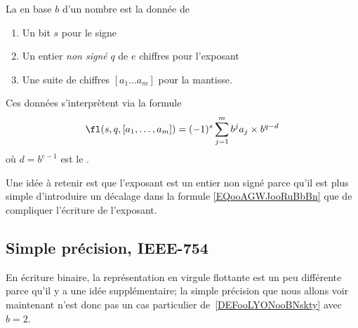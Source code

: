 \begin{definition}     \label{DEFooLYONooBNskty}
    La  en base \( b\) d'un nombre est la donnée de
    \begin{enumerate}
        \item
            Un bit \( s\) pour le signe
        \item
            Un entier \emph{non signé} \( q\) de \( e\) chiffres pour l'exposant
        \item
            Une suite de chiffres \( [a_1\ldots a_m]\) pour la mantisse.
    \end{enumerate}
    Ces données s'interprètent via la formule
    \begin{equation}        \label{EQooAGWJooRuBbBn}
        \fl( s,q,[a_1,\ldots, a_m]  )=(-1)^s\sum_{j=1}^mb^ja_j\times b^{q-d}
    \end{equation}
    où \( d=b^{e-1}\) est le .
\end{definition}
Une idée à retenir est que l'exposant est un entier non signé parce qu'il est plus simple d'introduire un décalage dans la formule \eqref{EQooAGWJooRuBbBn} que de compliquer l'écriture de l'exposant.

\subsection{Simple précision, IEEE-754}

En écriture binaire, la représentation en virgule flottante est un peu différente parce qu'il y a une idée supplémentaire; la simple précision que nous allons voir maintenant n'est donc pas un cas particulier de~\ref{DEFooLYONooBNskty} avec \( b=2\).

